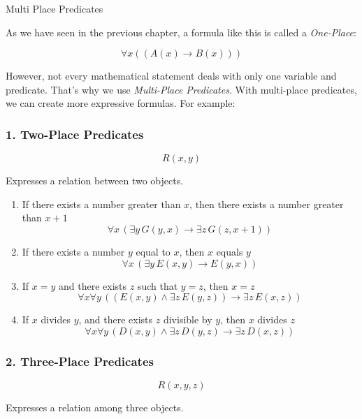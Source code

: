 Multi Place Predicates

As we have seen in the previous chapter, a formula like this is called a
\emph{One-Place}:

\[\forall x((A(x) \rightarrow B(x)))\]

However, not every mathematical statement deals with only one variable
and predicate. That's why we use \emph{Multi-Place Predicates}. With
multi-place predicates, we can create more expressive formulas. For
example:

\subsubsection{1. Two-Place Predicates}\label{two-place-predicates}

\[R(x,y)\]

Expresses a relation between two objects.

\begin{enumerate}
\def\labelenumi{\arabic{enumi}.}
\item
  If there exists a number greater than \(x\), then there exists a
  number greater than \(x+1\)
  \[\forall x \, (\exists y \, G(y,x) \rightarrow \exists z \, G(z,x+1))\]
\item
  If there exists a number \(y\) equal to \(x\), then \(x\) equals \(y\)
  \[\forall x \, (\exists y \, E(x,y) \rightarrow E(y,x))\]
\item
  If \(x=y\) and there exists \(z\) such that \(y=z\), then \(x=z\)
  \[\forall x \forall y \, ((E(x,y) \land \exists z \, E(y,z)) \rightarrow \exists z \, E(x,z))\]
\item
  If \(x\) divides \(y\), and there exists \(z\) divisible by \(y\),
  then \(x\) divides \(z\)
  \[\forall x \forall y \, (D(x,y) \land \exists z \, D(y,z) \rightarrow \exists z \, D(x,z))\]
\end{enumerate}

\subsubsection{2. Three-Place Predicates}\label{three-place-predicates}

\[R(x,y,z)\]

Expresses a relation among three objects.

